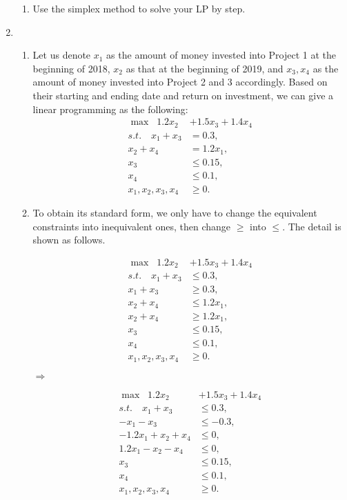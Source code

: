 \documentclass[12pt,a4paper]{article}
\makeatletter
\newtheorem*{solution}{Solution}
\theoremstyle{definition}
\renewenvironment{solution}[1][Solution] {\par\pushQED{\qed}\normalfont\topsep6\p@\@plus6\p@\relax\trivlist\item[\hskip\labelsep\bfseries#1\@addpunct{.}]\ignorespaces}{\popQED\endtrivlist\@endpefalse} \makeatother
\makeatother
\begin{document}
\begin{enumerate}
\begin{enumerate}
    \item
    Use the simplex method to solve your LP by step.
    \end{enumerate}
	\begin{solution}
		\begin{enumerate}
			\item Let us denote $x_1$ as the amount of money invested into Project 1 at the beginning of 2018, $x_2$ as that at the beginning of 2019, and $x_3,x_4$ as the amount of money invested into Project 2 and 3 accordingly. Based on their starting and ending date and return on investment, we can give a linear programming as the following:
			\begin{align*}
				\max\;\; 1.2x_2&+1.5x_3+1.4x_4\\
				s.t. \quad x_1+x_3&=0.3,\\
				x_2+x_4&=1.2x_1,\\
				x_3&\leq0.15,\\
				x_4&\leq0.1,\\
				x_1,x_2,x_3,x_4&\geq0.
			\end{align*}
			\item To obtain its standard form, we only have to change the equivalent constraints into inequivalent ones, then change $\geq$ into $\leq$. The detail is shown as follows. \newline
			\begin{minipage}{0.45\textwidth}
				\begin{align*}
				\max\;\; 1.2x_2&+1.5x_3+1.4x_4	\\
				s.t. \quad x_1+x_3&\leq0.3,   \\
				x_1+x_3&\geq0.3,  \\
				x_2+x_4&\leq1.2x_1,  \\
				x_2+x_4&\geq1.2x_1, \\
				x_3&\leq0.15, \\
				x_4&\leq0.1 ,\\
				x_1,x_2,x_3,x_4&\geq0 . 
				\end{align*} 
			\end{minipage}
			$\Rightarrow$
			\begin{minipage}{0.45\textwidth}
				\begin{align*}
				\max\;\; 1.2x_2&+1.5x_3+1.4x_4\\
				s.t. \quad x_1+x_3&\leq0.3,\\
				-x_1-x_3&\leq-0.3,\\
				-1.2x_1+x_2+x_4&\leq0,\\
				1.2x_1-x_2-x_4&\leq0,\\
				x_3&\leq0.15,\\
				x_4&\leq0.1,\\
				x_1,x_2,x_3,x_4&\geq0.
				\end{align*} 
			\end{minipage}
			

\end{enumerate}
\end{solution}
\end{enumerate}
\end{document}
